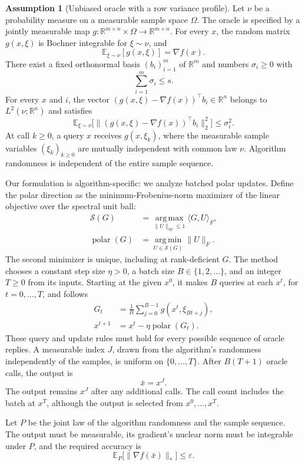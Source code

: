 \documentclass[10pt]{article}
\theoremstyle{definition}
\newtheorem{assumption}{Assumption}
\begin{document}
\begin{assumption}[Unbiased oracle with a row variance profile]
Let $\nu$ be a probability measure on a measurable sample space $\Omega$. The oracle is specified by a jointly measurable map
$g:\mathbb{R}^{m\times n}\times\Omega\to\mathbb{R}^{m\times n}$.
For every $x$, the random matrix $g(x,\xi)$ is Bochner integrable for $\xi\sim\nu$, and
\[
\mathbb{E}_{\xi\sim\nu}[g(x,\xi)]=\nabla f(x).
\]
There exist a fixed orthonormal basis $(b_i)_{i=1}^m$ of $\mathbb{R}^m$ and numbers $\sigma_i\geq0$ with
\[
\sum_{i=1}^m\sigma_i\leq s.
\]
For every $x$ and $i$, the vector
$(g(x,\xi)-\nabla f(x))^\top b_i\in\mathbb{R}^n$ belongs to $L^2(\nu;\mathbb{R}^n)$ and satisfies
\[
\mathbb{E}_{\xi\sim\nu}
\bigl[\|(g(x,\xi)-\nabla f(x))^\top b_i\|_2^2\bigr]
\leq\sigma_i^2.
\]
At call $k\geq0$, a query $x$ receives $g(x,\xi_k)$, where the measurable sample variables $(\xi_k)_{k\geq0}$ are mutually independent with common law $\nu$. Algorithm randomness is independent of the entire sample sequence.
\end{assumption}

Our formulation is algorithm-specific: we analyze batched polar updates. Define the polar direction as the minimum-Frobenius-norm maximizer of the linear objective over the spectral unit ball:
\[
\begin{aligned}
\mathcal{S}(G)
&=\underset{\|U\|_{\mathrm{op}}\leq1}{\operatorname{arg\,max}}
\langle G,U\rangle_F,\\
\operatorname{polar}(G)
&=\underset{U\in\mathcal{S}(G)}{\operatorname{arg\,min}}\|U\|_F.
\end{aligned}
\]
The second minimizer is unique, including at rank-deficient $G$. The method chooses a constant step size $\eta>0$, a batch size $B\in\{1,2,\ldots\}$, and an integer $T\geq0$ from its inputs. Starting at the given $x^0$, it makes $B$ queries at each $x^t$, for $t=0,\ldots,T$, and follows
\[
\begin{aligned}
G_t&=\frac{1}{B}\sum_{j=0}^{B-1}g(x^t,\xi_{Bt+j}),\\
x^{t+1}&=x^t-\eta\operatorname{polar}(G_t).
\end{aligned}
\]
These query and update rules must hold for every possible sequence of oracle replies. A measurable index $J$, drawn from the algorithm's randomness independently of the samples, is uniform on $\{0,\ldots,T\}$. After $B(T+1)$ oracle calls, the output is
\[
\bar{x}=x^J.
\]
The output remains $x^J$ after any additional calls. The call count includes the batch at $x^T$, although the output is selected from $x^0,\ldots,x^T$.

Let $P$ be the joint law of the algorithm randomness and the sample sequence. The output must be measurable, its gradient's nuclear norm must be integrable under $P$, and the required accuracy is
\[
\mathbb{E}_{P}\bigl[\|\nabla f(\bar{x})\|_*\bigr]\leq\varepsilon.
\]
\end{document}
